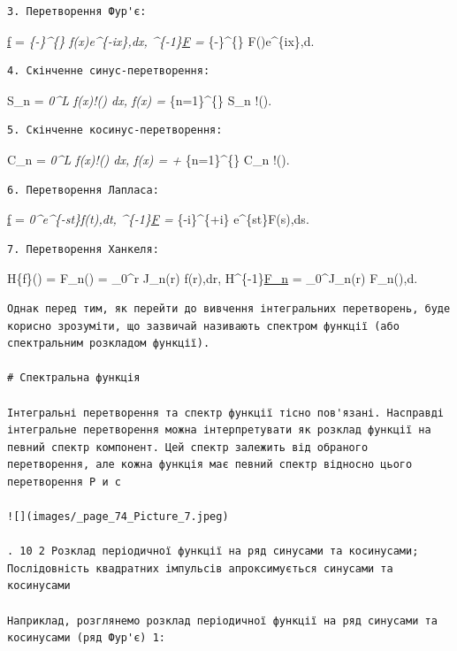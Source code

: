 \documentclass[
  ukrainian,
]{article}
\begin{document}
\begin{verbatim}
3. Перетворення Фур'є:
\end{verbatim}

\href{/omega}{f} =
\int\emph{\{-\infty\}\^{}\{\infty\}
f(x)e\^{}\{-i\omega x\},dx, \^{}\{-1\}\href{x}{F} =
\int}\{-\infty\}\^{}\{\infty\}
F(\omega)e\^{}\{i\omega x\},d\omega.

\begin{verbatim}
4. Скінченне синус-перетворення:
\end{verbatim}

S\_n = \int\emph{0\^{}L
f(x)\sin!\left(\right) dx, f(x) =
\sum}\{n=1\}\^{}\{\infty\} S\_n \sin!\left(\right).

\begin{verbatim}
5. Скінченне косинус-перетворення:
\end{verbatim}

C\_n = \int\emph{0\^{}L
f(x)\cos!\left(\right) dx, f(x) =  +
\sum}\{n=1\}\^{}\{\infty\} C\_n \cos!\left(\right).

\begin{verbatim}
6. Перетворення Лапласа:
\end{verbatim}

\href{s}{f} = \int\emph{0\^{}\infty e\^{}\{-st\}f(t),dt,
\^{}\{-1\}\href{t}{F} =
\int}\{\gamma-i\infty\}\^{}\{\gamma+i\infty\}
e\^{}\{st\}F(s),ds.

\begin{verbatim}
7. Перетворення Ханкеля:
\end{verbatim}

H\{f\}(\xi) = F\_n(\xi) = \int\_0\^{}\infty r J\_n(\xi r) f(r),dr,
H\^{}\{-1\}\href{r}{F\_n} = \int\_0\^{}\infty \xi J\_n(\xi r)
F\_n(\xi),d\xi.

\begin{verbatim}
Однак перед тим, як перейти до вивчення інтегральних перетворень, буде корисно зрозуміти, що зазвичай називають спектром функції (або спектральним розкладом функції).

# Спектральна функція

Інтегральні перетворення та спектр функції тісно пов'язані. Насправді інтегральне перетворення можна інтерпретувати як розклад функції на певний спектр компонент. Цей спектр залежить від обраного перетворення, але кожна функція має певний спектр відносно цього перетворення Р и с

![](images/_page_74_Picture_7.jpeg)

. 10 2 Розклад періодичної функції на ряд синусами та косинусами; Послідовність квадратних імпульсів апроксимується синусами та косинусами

Наприклад, розглянемо розклад періодичної функції на ряд синусами та косинусами (ряд Фур'є) 1:
\end{verbatim}
\end{document}
